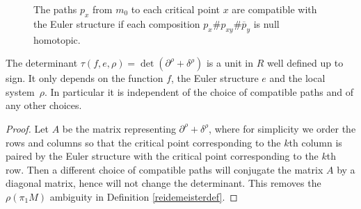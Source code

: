 \begin{figure}[htbp]
\begin{center}
\caption{\smaller The paths $p_x$ from $m_0$ to each critical point $x$ are compatible with the Euler structure if each composition $p_x\# p_{xy}\# \overline p_y$ is null homotopic.}
\label{Fig: Euler}
\end{center}
\end{figure}

\begin{lemma}\label{indet}
The determinant $\tau(f,e,\rho)=\det(\partial^\rho + \delta^\rho)$ is a unit in $R$ well defined up to sign. It only depends on the function $f$, the Euler structure $e$ and the local system~$\rho$. In particular it is independent of the choice of compatible paths and of any other choices.
\end{lemma}

\begin{proof}
Let $A$ be the matrix representing $\partial^\rho + \delta^\rho$, where for simplicity we order the rows and columns so that the critical point corresponding to the $k$th column is paired by the Euler structure with the critical point corresponding to the $k$th row. Then a different choice of compatible paths will conjugate the matrix $A$ by a diagonal matrix, hence will not change the determinant. This removes the $\rho(\pi_1M)$ ambiguity in Definition \ref{reidemeisterdef}.
\end{proof}

